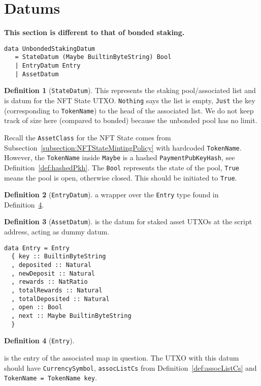 \documentclass[10pt, a4paper]{article}
\theoremstyle{definition}
\newtheorem{definition}{Definition}[section]
\begin{document}
\section{Datums}
\textbf{This section is different to that of bonded staking.}

\begin{verbatim}
data UnbondedStakingDatum
   = StateDatum (Maybe BuiltinByteString) Bool
   | EntryDatum Entry
   | AssetDatum

\end{verbatim}

\begin{definition}[\texttt{StateDatum}]\label{def:StateDatum} This represents the staking pool/associated list and is datum for the NFT State UTXO. \texttt{Nothing} says the list is empty, \texttt{Just} the key (corresponding to \texttt{TokenName}) to the head of the associated list. We do not keep track of size here (compared to bonded) because the unbonded pool has no limit.

Recall the \texttt{AssetClass} for the NFT State comes from Subsection~\ref{subsection:NFTStateMintingPolicy} with hardcoded \texttt{TokenName}. However, the \texttt{TokenName} inside \texttt{Maybe} is a hashed \texttt{PaymentPubKeyHash}, see Definition~\ref{def:hashedPkh}. The \texttt{Bool} represents the state of the pool, \texttt{True} means the pool is open, otherwise closed. This should be initiated to \texttt{True}.
\end{definition}

\begin{definition}[\texttt{EntryDatum}]\label{def:EntryDatum} a wrapper over the \texttt{Entry} type found in Definition~\ref{def:Entry}.
\end{definition}

\begin{definition}[\texttt{AssetDatum}]\label{def:AssetDatum} is the datum for staked asset UTXOs at the script address, acting as dummy datum.
\end{definition}

\begin{verbatim}
data Entry = Entry
  { key :: BuiltinByteString
  , deposited :: Natural
  , newDeposit :: Natural
  , rewards :: NatRatio
  , totalRewards :: Natural
  , totalDeposited :: Natural
  , open :: Bool
  , next :: Maybe BuiltinByteString
  }
\end{verbatim}
\begin{definition}[\texttt{Entry}]\label{def:Entry}
\end{definition} is the entry of the associated map in question. The UTXO with this datum should have \texttt{CurrencySymbol},  \texttt{assocListCs} from Definition~\ref{def:assocListCs} and \texttt{TokenName = TokenName key}.
\end{document}
